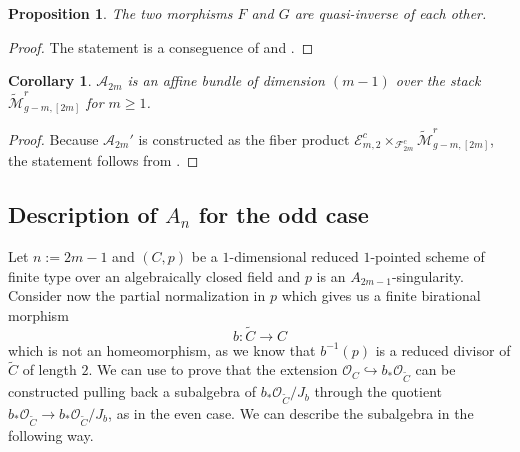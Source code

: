 \documentclass{alggeom}
\numberwithin{equation}{section}
\numberwithin{subsection}{section}
\newtheorem{proposition}[theorem]{Proposition}
\newtheorem{corollary}[theorem]{Corollary}
\theoremstyle{definition}
\theoremstyle{remark}
\newcommand\cA{\mathcal{A}} \newcommand\cB{\mathcal{B}}
\newcommand\cE{\mathcal{E}} \newcommand\cF{\mathcal{F}}
\newcommand\cO{\mathcal{O}} \newcommand\cP{\mathcal{P}}
\newcommand{\Mtilde}{\widetilde{\mathcal M}}
\begin{document}
\begin{proposition}\label{prop:descr-an-pari}
	The two morphisms $F$ and $G$ are quasi-inverse of each other.
\end{proposition}

\begin{proof}
	The statement is a conseguence of  and .
\end{proof}

\begin{corollary}\label{cor:descr-an-pari}
	$\cA_{2m}$ is an affine bundle of dimension $(m-1)$ over the stack $\Mtilde^r_{g-m,[2m]} $ for $m\geq 1$.
\end{corollary}

\begin{proof}
	Because $\cA_{2m}'$ is constructed as the fiber product $\cE_{m,2}^c \times_{\cF_{2m}^c} \Mtilde_{g-m,[2m]}^r$, the statement follows from .
\end{proof}

\subsection{Description of $A_n$ for the odd case}




Let $n:=2m-1$ and $(C,p)$ be a $1$-dimensional reduced $1$-pointed scheme of finite type over an algebraically closed field and $p$ is an $A_{2m-1}$-singularity. Consider now the partial normalization in $p$ which gives us a finite birational morphism 
$$b:\widetilde{C} \longrightarrow C$$ 
which is not an homeomorphism, as we know that $b^{-1}(p)$ is a reduced divisor of $\widetilde{C}$ of length $2$. We can use  to prove that the extension $\cO_C \hookrightarrow b_*\cO_{\widetilde{C}}$ can be constructed pulling back a subalgebra of $b_*\cO_{\widetilde{C}}/J_b$ through the quotient $b_*\cO_{\widetilde{C}}\rightarrow b_*\cO_{\widetilde{C}}/J_b$, as in the even case. We can describe the subalgebra in the following way.
\end{document}
